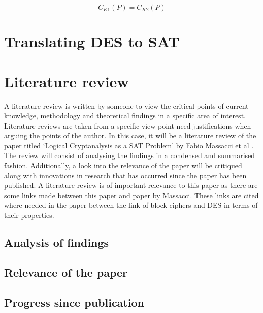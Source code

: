 \documentclass[11pt,a4paper]{report}
\begin{document}
\begin{displaymath}
C_{K1}(P) = C_{K2}(P)
\end{displaymath}


\chapter{Translating DES to SAT}
\label{cha:AppDESSAT}

\chapter{Literature review}
\label{cha:LitReview}
A literature review is written by someone to view the critical points of current knowledge, methodology and theoretical findings in a specific area of interest. Literature reviews are taken from a specific view point need justifications when arguing the points of the author. In this case, it will be a literature review of the paper titled `Logical Cryptanalysis as a SAT Problem' by Fabio Massacci et al \cite{Fabio2000LogicalSAT}. The review will consist of analysing the findings in a condensed and summarised fashion. Additionally, a look into the relevance of the paper will be critiqued along with innovations in research that has occurred since the paper has been published. A literature review is of important relevance to this paper as there are some links made between this paper and paper by Massacci. These links are cited where needed in the paper between the link of block ciphers and DES in terms of their properties.  



\section{Analysis of findings}
\label{sec:AnalysisOF}

\section{Relevance of the paper}
\label{sec:RelOfPaper}

\section{Progress since publication}
\label{sec:ProgressSP}
\end{document}
